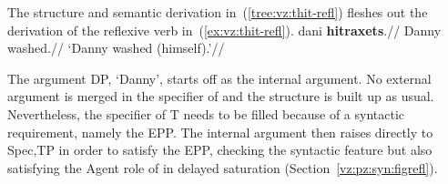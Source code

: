 The structure and semantic derivation in~(\ref{tree:vz:thit-refl}) fleshes out the derivation of the reflexive verb in~(\ref{ex:vz:thit-refl}).
\ex \label{ex:vz:thit-refl}
\begingl
\gla dani \textbf{hitraxets}.//
\glb Danny washed.//
\glft `Danny washed (himself).'//
\endgl
\xe

The argument DP, `Danny', starts off as the internal argument. No external argument is merged in the specifier of {\vz} and the structure is built up as usual. Nevertheless, the specifier of T needs to be filled because of a syntactic requirement, namely the EPP. The internal argument then raises directly to Spec,TP in order to satisfy the EPP, checking the syntactic feature but also satisfying the Agent role of {\vz} in delayed saturation (Section~\ref{vz:pz:syn:figrefl}).

\ex \label{tree:vz:thit-refl}
\hspace{-7em}
\xe
{}
%

